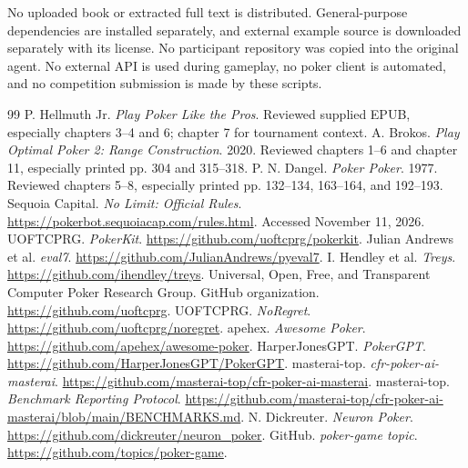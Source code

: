 \documentclass[11pt,letterpaper]{article}
\begin{document}
No uploaded book or extracted full text is distributed. General-purpose
dependencies are installed separately, and external example source is
downloaded separately with its license. No participant repository was copied
into the original agent. No external API is used during gameplay, no poker
client is automated, and no competition submission is made by these scripts.

\clearpage
\begin{thebibliography}{99}\small
{} P. Hellmuth Jr. \emph{Play Poker Like the Pros}.
Reviewed supplied EPUB, especially chapters 3--4 and 6; chapter 7 for
tournament context.
 A. Brokos. \emph{Play Optimal Poker 2: Range Construction}.
2020. Reviewed chapters 1--6 and chapter 11, especially printed
pp. 304 and 315--318.
 P. N. Dangel. \emph{Poker Poker}. 1977.
Reviewed chapters 5--8, especially printed pp. 132--134, 163--164,
and 192--193.
 Sequoia Capital. \emph{No Limit: Official Rules}.
\url{https://pokerbot.sequoiacap.com/rules.html}. Accessed November 11, 2026.
 UOFTCPRG. \emph{PokerKit}.
\url{https://github.com/uoftcprg/pokerkit}.
 Julian Andrews et al. \emph{eval7}.
\url{https://github.com/JulianAndrews/pyeval7}.
 I. Hendley et al. \emph{Treys}.
\url{https://github.com/ihendley/treys}.
 Universal, Open, Free, and Transparent Computer Poker
Research Group. GitHub organization. \url{https://github.com/uoftcprg}.
 UOFTCPRG. \emph{NoRegret}.
\url{https://github.com/uoftcprg/noregret}.
 apehex. \emph{Awesome Poker}.
\url{https://github.com/apehex/awesome-poker}.
 HarperJonesGPT. \emph{PokerGPT}.
\url{https://github.com/HarperJonesGPT/PokerGPT}.
 masterai-top. \emph{cfr-poker-ai-masterai}.
\url{https://github.com/masterai-top/cfr-poker-ai-masterai}.
 masterai-top. \emph{Benchmark Reporting Protocol}.
\url{https://github.com/masterai-top/cfr-poker-ai-masterai/blob/main/BENCHMARKS.md}.
 N. Dickreuter. \emph{Neuron Poker}.
\url{https://github.com/dickreuter/neuron_poker}.
 GitHub. \emph{poker-game topic}.
\url{https://github.com/topics/poker-game}.
\end{thebibliography}
\end{document}
